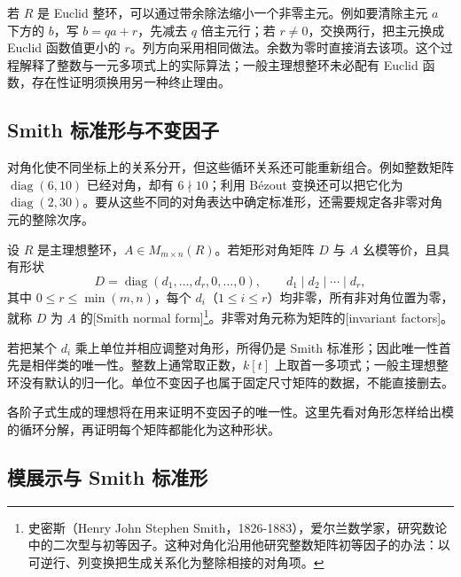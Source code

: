 \ProseParagraphBreak
若 \(R\) 是 Euclid 整环，可以通过带余除法缩小一个非零主元。例如要清除主元 \(a\) 下方的 \(b\)，写 \(b=qa+r\)，先减去 \(q\) 倍主元行；若 \(r\ne0\)，交换两行，把主元换成 Euclid 函数值更小的 \(r\)。列方向采用相同做法。余数为零时直接消去该项。这个过程解释了整数与一元多项式上的实际算法；一般主理想整环未必配有 Euclid 函数，存在性证明须换用另一种终止理由。

\subsection{Smith 标准形与不变因子}
\label{b2:subsec:0401:02}

对角化使不同坐标上的关系分开，但这些循环关系还可能重新组合。例如整数矩阵 \(\operatorname{diag}(6,10)\) 已经对角，却有 \(6\nmid10\)；利用 Bézout 变换还可以把它化为 \(\operatorname{diag}(2,30)\)。要从这些不同的对角表达中确定标准形，还需要规定各非零对角元的整除次序。

\begin{definition}\label{b2:def:smith-normal-form}
	设 \(R\) 是主理想整环，\(A\in M_{m\times n}(R)\)。若矩形对角矩阵 \(D\) 与 \(A\) 幺模等价，且具有形状
	\[
		D=\operatorname{diag}(d_1,\ldots,d_r,0,\ldots,0), \qquad d_1\mid d_2\mid\cdots\mid d_r,
	\]
	其中 \(0\le r\le\min(m,n)\)，每个 \(d_i\)（\(1\le i\le r\)）均非零，所有非对角位置为零，就称 \(D\) 为 \(A\) 的[Smith normal form]\footnote{史密斯（Henry John Stephen Smith，1826-1883），爱尔兰数学家，研究数论中的二次型与初等因子。这种对角化沿用他研究整数矩阵初等因子的办法：以可逆行、列变换把生成关系化为整除相接的对角项。}。非零对角元称为矩阵的[invariant factors]。
\end{definition}

若把某个 \(d_i\) 乘上单位并相应调整对角形，所得仍是 Smith 标准形；因此唯一性首先是相伴类的唯一性。整数上通常取正数，\(k[t]\) 上取首一多项式；一般主理想整环没有默认的归一化。单位不变因子也属于固定尺寸矩阵的数据，不能直接删去。

\ProseParagraphBreak
各阶子式生成的理想将在用来证明不变因子的唯一性。这里先看对角形怎样给出模的循环分解，再证明每个矩阵都能化为这种形状。

\subsection{模展示与 Smith 标准形}
\label{b2:subsec:0401:03}

